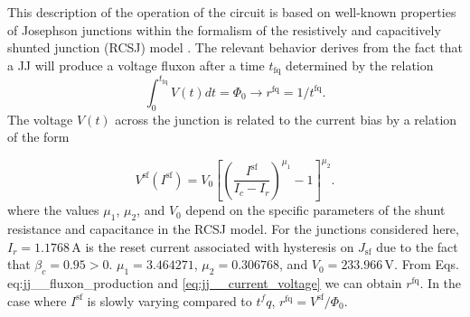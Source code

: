 \documentclass[twocolumn]{article}
\begin{document}
This description of the operation of the circuit is based on well-known properties of Josephson junctions within the formalism of the resistively and capacitively shunted junction (RCSJ) model \cite{vatu1998,ka1999,ti1996}. The relevant behavior derives from the fact that a JJ will produce a voltage fluxon after a time $t_{\mathrm{fq}}$ determined by the relation
\begin{equation}
\label{eq:jj__fluxon_production}
\int_0^{t_{\mathrm{fq}}}V(t)dt = \Phi_0 \rightarrow r^{\mathrm{fq}} = 1/t^{\mathrm{fq}}.
\end{equation}
The voltage $V(t)$ across the junction is related to the current bias by a relation of the form

\begin{equation}
\label{eq:jj__current_voltage}
V^{\mathrm{sf}}(I^{\mathrm{sf}}) = V_0\left[ \left( \frac{I^{\mathrm{sf}}}{I_c-I_r} \right)^{\mu_1} - 1 \right]^{\mu_2}.
\end{equation} 
where the values $\mu_1$, $\mu_2$, and $V_0$ depend on the specific parameters of the shunt resistance and capacitance in the RCSJ model. For the junctions considered here, $I_r = 1.1768$\,\textmu A is the reset current associated with hysteresis on $J_{\mathrm{sf}}$ due to the fact that $\beta_c = 0.95 > 0$. $\mu_1 = 3.464271$, $\mu_2 = 0.306768$, and $V_0 = 233.966$\,\textmu V. From Eqs.\,{eq:jj__fluxon_production} and \ref{eq:jj__current_voltage} we can obtain $r^{\mathrm{fq}}$. In the case where $I^{\mathrm{sf}}$ is slowly varying compared to $t^fq$, $ r^{\mathrm{fq}} = V^{\mathrm{sf}}/\Phi_0$. 

\end{document}
